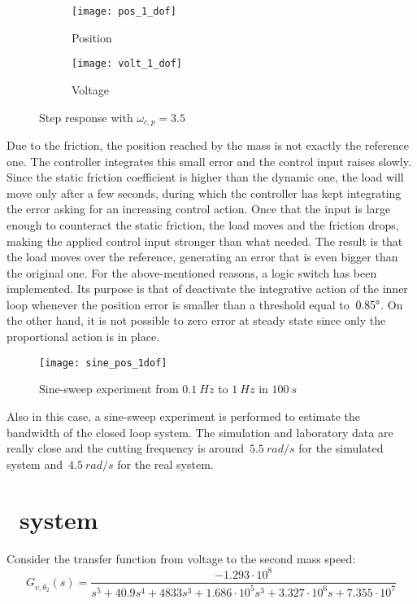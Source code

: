 \begin{figure*}[h]
	\centering
	\begin{subfigure}{0.45\columnwidth}
		\texttt{[image: pos\_1\_dof]}
		\caption{Position}
	\end{subfigure}
	\begin{subfigure}{0.45\columnwidth}
		\texttt{[image: volt\_1\_dof]}
		\caption{Voltage}
	\end{subfigure}
	\caption{Step response with $\omega_{c,p}=3.5$}
	\label{fig:Pos_1dof_3.5}
\end{figure*}

\newpage
Due to the friction, the position reached by the mass is not exactly the reference one. The controller integrates this small error and the control input raises slowly. Since the static friction coefficient is higher than the dynamic one, the load will move only after a few seconds, during which the controller has kept integrating the error asking for an increasing control action.
Once that the input is large enough to counteract the static friction, the load moves and the friction drops, making the applied control input stronger than what needed. The result is that the load moves over the reference, generating an error that is even bigger than the original one.
For the above-mentioned reasons, a logic switch has been implemented. Its purpose is that of deactivate the integrative action of the inner loop whenever the position error is smaller than a threshold equal to~$0.85 \degree$. On the other hand, it is not possible to zero error at steady state since only the proportional action is in place.
\begin{figure*}[h]
	\centering
	\texttt{[image: sine\_pos\_1dof]}
	\caption{Sine-sweep experiment from $0.1\ Hz$ to $1\ Hz$ in $100\ s$}
	\label{fig:sinesweep_pos_1dof}
\end{figure*}

Also in this case, a sine-sweep experiment is performed to estimate the bandwidth of the closed loop system. The simulation and laboratory data are really close and the cutting frequency is around~$5.5\ rad/s$ for the simulated system and~$4.5\ rad/s$ for the real system.

\section{\twodof\ system}
Consider the transfer function from voltage to the second mass speed:
\[
G_{v,\dot{\theta}_2}(s)=
\frac{-1.293 \cdot 10^{8}}{s^5+40.9s^{4}+4833s^{3}+1.686 \cdot 10^{5} s^{3}+3.327 \cdot 10^{6} s+7.355 \cdot 10^{7}}
\]

